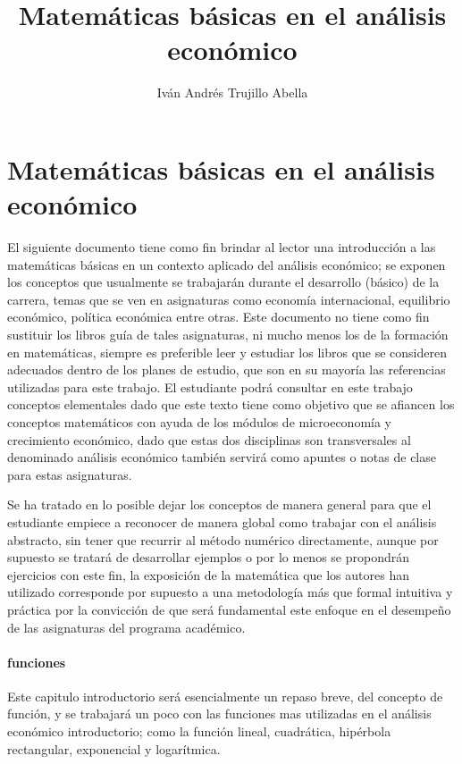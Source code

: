\documentclass[12pt]{article}
\title{Matemáticas básicas en el análisis económico}
\author{Iván Andrés Trujillo Abella}
\date{}
\begin{document}
\part*{Matemáticas básicas en el análisis económico}


El siguiente documento tiene como fin brindar al lector una introducción a las matemáticas básicas en un contexto aplicado del análisis económico; se exponen los conceptos que usualmente se  trabajarán durante el desarrollo (básico) de la carrera, temas que se ven  en asignaturas como  economía internacional, equilibrio económico, política económica entre otras. Este  documento no  tiene como fin sustituir los libros guía de tales asignaturas, ni mucho menos los de  la formación en matemáticas, siempre es preferible leer y estudiar los libros que se  consideren adecuados dentro de los planes de estudio, que son en su mayoría las referencias utilizadas para este trabajo. El estudiante podrá consultar en este trabajo  conceptos elementales dado que este texto tiene como objetivo que se afiancen los conceptos matemáticos con ayuda de los módulos de microeconomía y crecimiento económico,  dado que estas dos disciplinas son transversales al denominado análisis económico también servirá como apuntes o notas de clase  para estas asignaturas.

Se ha tratado en lo posible dejar los conceptos de manera general para que el estudiante empiece a reconocer de manera global como trabajar con el análisis abstracto, sin tener que recurrir al método numérico directamente, aunque por supuesto se tratará de desarrollar ejemplos o por lo menos se propondrán  ejercicios con este fin, la exposición de la matemática que los autores han utilizado corresponde por supuesto a una metodología más que formal intuitiva y práctica por la convicción de que será fundamental este enfoque en el desempeño de las asignaturas del programa académico.

\newpage

\subsection{funciones}

Este capitulo introductorio será esencialmente un repaso breve, del concepto de función, y se trabajará un poco con las funciones mas utilizadas en el análisis económico introductorio; como la función lineal, cuadrática, hipérbola rectangular, exponencial y logarítmica. 

\\
\end{document}
